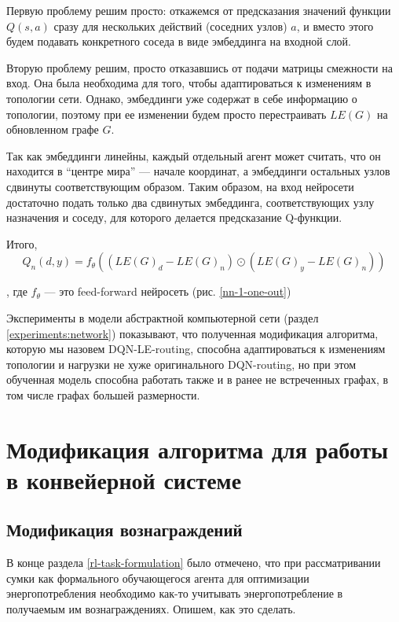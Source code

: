 \documentclass[specification,annotation,times]{itmo-student-thesis}
\theoremstyle{definition}
\begin{document}
Первую проблему решим просто: откажемся от предсказания значений функции
$Q(s, a)$ сразу для нескольких действий (соседних узлов) $a$, и вместо этого
будем подавать конкретного соседа в виде эмбеддинга на входной слой.

Вторую проблему решим, просто отказавшись от подачи матрицы смежности на вход.
Она была необходима для того, чтобы адаптироваться к изменениям в топологии
сети. Однако, эмбеддинги уже содержат в себе информацию о топологии, поэтому при
ее изменении будем просто перестраивать $LE(G)$ на обновленном графе $G$.

Так как эмбеддинги линейны, каждый отдельный агент может считать, что он
находится в ``центре мира'' --- начале координат, а эмбеддинги остальных узлов
сдвинуты соответствующим образом. Таким образом, на вход нейросети достаточно
подать только два сдвинутых эмбеддинга, соответствующих узлу назначения и
соседу, для которого делается предсказание Q-функции.

Итого,
\begin{equation}
  Q_n(d, y) = f_{\theta}( (LE(G)_d - LE(G)_n) \odot (LE(G)_y - LE(G)_n))
\end{equation}

, где $f_{\theta}$ --- это feed-forward нейросеть (рис. \ref{nn-1-one-out})

Эксперименты в модели абстрактной компьютерной сети (раздел
\ref{experiments:network}) показывают, что полученная модификация алгоритма,
которую мы назовем DQN-LE-routing, способна адаптироваться к изменениям
топологии и нагрузки не хуже оригинального DQN-routing, но при этом обученная
модель способна работать также и в ранее не встреченных графах, в том числе
графах большей размерности.

\section{Модификация алгоритма для работы в конвейерной системе}

\subsection{Модификация вознаграждений}

В конце раздела \ref{rl-task-formulation} было отмечено, что при рассматривании
сумки как формального обучающегося агента для оптимизации энергопотребления
необходимо как-то учитывать энергопотребление в получаемым им вознаграждениях.
Опишем, как это сделать.
\end{document}

